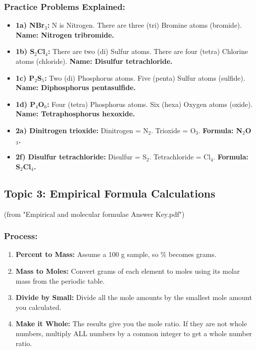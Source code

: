 \documentclass{article}
\begin{document}
\subsubsection*{Practice Problems Explained:}
\begin{itemize}[itemsep=5pt]
    \item \textbf{1a) NBr$_3$:} N is Nitrogen. There are three (tri) Bromine atoms (bromide). \textbf{Name: Nitrogen tribromide.}
    \item \textbf{1b) S$_2$Cl$_4$:} There are two (di) Sulfur atoms. There are four (tetra) Chlorine atoms (chloride). \textbf{Name: Disulfur tetrachloride.}
    \item \textbf{1c) P$_2$S$_5$:} Two (di) Phosphorus atoms. Five (penta) Sulfur atoms (sulfide). \textbf{Name: Diphosphorus pentasulfide.}
    \item \textbf{1d) P$_4$O$_6$:} Four (tetra) Phosphorus atoms. Six (hexa) Oxygen atoms (oxide). \textbf{Name: Tetraphosphorus hexoxide.}
    \item \textbf{2a) Dinitrogen trioxide:} Dinitrogen = N$_2$. Trioxide = O$_3$. \textbf{Formula: N$_2$O$_3$.}
    \item \textbf{2f) Disulfur tetrachloride:} Disulfur = S$_2$. Tetrachloride = Cl$_4$. \textbf{Formula: S$_2$Cl$_4$.}
\end{itemize}

\bigskip
\subsection*{Topic 3: Empirical Formula Calculations}
(from "Empirical and molecular formulae Answer Key.pdf")

\subsubsection*{Process:}
\begin{enumerate}[itemsep=5pt]
    \item \textbf{Percent to Mass:} Assume a 100 g sample, so \% becomes grams.
    \item \textbf{Mass to Moles:} Convert grams of each element to moles using its molar mass from the periodic table.
    \item \textbf{Divide by Small:} Divide all the mole amounts by the smallest mole amount you calculated.
    \item \textbf{Make it Whole:} The results give you the mole ratio. If they are not whole numbers, multiply ALL numbers by a common integer to get a whole number ratio.
\end{enumerate}
\end{document}
